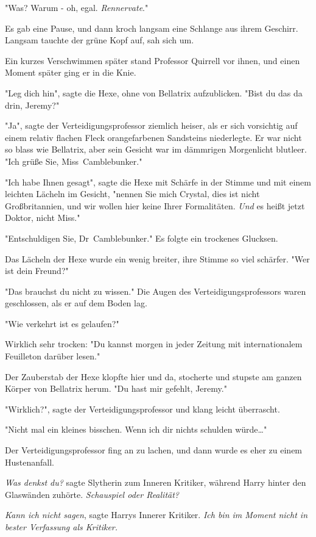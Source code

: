 {"Was? Warum - oh, egal. \emph{Rennervate}."

Es gab eine Pause, und dann kroch langsam eine Schlange aus ihrem Geschirr. Langsam tauchte der grüne Kopf auf, sah sich um.

Ein kurzes Verschwimmen später stand Professor Quirrell vor ihnen, und einen Moment später ging er in die Knie.

"Leg dich hin", sagte die Hexe, ohne von Bellatrix aufzublicken. "Bist du das da drin, Jeremy?"

"Ja", sagte der Verteidigungsprofessor ziemlich heiser, als er sich vorsichtig auf einem relativ flachen Fleck orangefarbenen Sandsteins niederlegte. Er war nicht so blass wie Bellatrix, aber sein Gesicht war im dämmrigen Morgenlicht blutleer. "Ich grüße Sie, Miss~Camblebunker."

"Ich habe Ihnen gesagt", sagte die Hexe mit Schärfe in der Stimme und mit einem leichten Lächeln im Gesicht, "nennen Sie mich Crystal, dies ist nicht Großbritannien, und wir wollen hier keine Ihrer Formalitäten. \emph{Und} es heißt jetzt Doktor, nicht Miss."

"Entschuldigen Sie, Dr~Camblebunker." Es folgte ein trockenes Glucksen.

Das Lächeln der Hexe wurde ein wenig breiter, ihre Stimme so viel schärfer. "Wer ist dein Freund?"

"Das brauchst du nicht zu wissen." Die Augen des Verteidigungsprofessors waren geschlossen, als er auf dem Boden lag.

"Wie verkehrt ist es gelaufen?"

Wirklich sehr trocken: "Du kannst morgen in jeder Zeitung mit internationalem Feuilleton darüber lesen."

Der Zauberstab der Hexe klopfte hier und da, stocherte und stupste am ganzen Körper von Bellatrix herum. "Du hast mir gefehlt, Jeremy."

"Wirklich?", sagte der Verteidigungsprofessor und klang leicht überrascht.

"Nicht mal ein kleines bisschen. Wenn ich dir nichts schulden würde…"

Der Verteidigungsprofessor fing an zu lachen, und dann wurde es eher zu einem Hustenanfall.

\emph{Was denkst du?} sagte Slytherin zum Inneren Kritiker, während Harry hinter den Glaswänden zuhörte. \emph{Schauspiel oder Realität?}

\emph{Kann ich nicht sagen}, sagte Harrys Innerer Kritiker. \emph{Ich bin im Moment nicht in bester Verfassung als Kritiker.}

}
